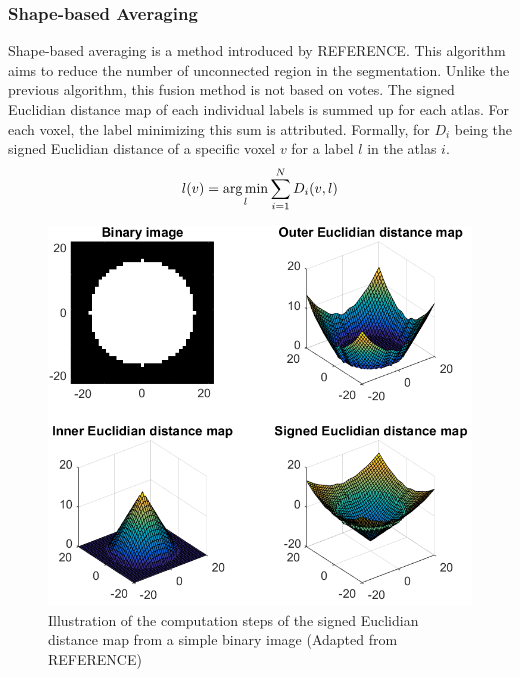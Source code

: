 \subsubsection*{Shape-based Averaging}
Shape-based averaging is a method introduced by REFERENCE. This algorithm aims to reduce the number of unconnected region in the segmentation. Unlike the previous algorithm, this fusion method is not based on votes. The signed Euclidian distance map of each individual labels is summed up for each atlas. For each voxel, the label minimizing this sum is attributed. Formally, for $D_i$ being the signed Euclidian distance of a specific voxel $v$ for a label $l$ in the atlas $i$.
\[ l(v) = \operatorname*{arg\,min}_l\sum_{i=1}^{N} D_i(v, l) \]

\begin{figure}[h!]
	\centering
	\includegraphics[width=0.8\linewidth]{img/distMap}
	\caption{Illustration of the computation steps of the signed Euclidian distance map from a simple binary image (Adapted from REFERENCE)}
	\label{fig:distMap}
\end{figure}
